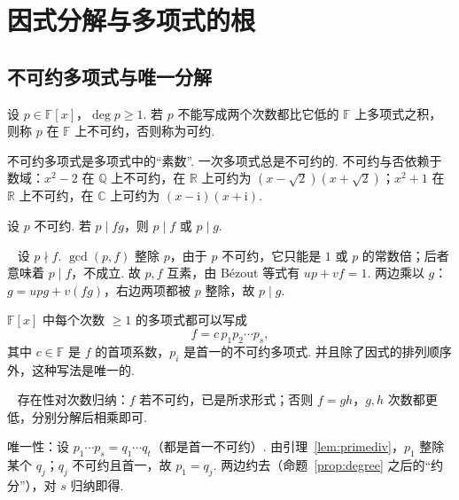 \documentclass[lang=cn,10.5pt,scheme=chinese,toc=twocol,section,chinesefont=nofont,
twoside,citestyle=gb7714-2015,bibstyle=gb7714-2015]{elegantbook}
\DeclareRobustCommand{\textbf}[1]{{\lnsemiboldlatin\lnsemiboldcjk #1}}
\numberwithin{equation}{section}   %
\newcommand{\hB}{\texorpdfstring{\textdagger}{†}}
\newcommand{\hC}{\texorpdfstring{\textdaggerdbl}{‡}}
\newcommand*{\lnlabel}[1]{{\sffamily\bfseries\color{black}#1}}
\renewenvironment{proof}{%
	\par\noindent\lnlabel{\proofname}\;\ \color{black!90}\cfs}{\par}
\begin{document}
\section{\hB 因式分解与多项式的根}

\subsection{\hC 不可约多项式与唯一分解}

\begin{definition}
  设 $p\in\mathbb{F}[x]$，$\deg p\ge1$. 若 $p$ 不能写成两个次数都比它低的 $\mathbb{F}$ 上多项式之积，则称 $p$ 在 $\mathbb{F}$ 上\textbf{不可约}，否则称为\textbf{可约}.
\end{definition}

不可约多项式是多项式中的“素数”. 一次多项式总是不可约的. 不可约与否依赖于数域：$x^2-2$ 在 $\mathbb{Q}$ 上不可约，在 $\mathbb{R}$ 上可约为 $(x-\sqrt2)(x+\sqrt2)$；$x^2+1$ 在 $\mathbb{R}$ 上不可约，在 $\mathbb{C}$ 上可约为 $(x-\mathrm i)(x+\mathrm i)$.

\begin{lemma}
  \label{lem:primediv}
  设 $p$ 不可约. 若 $p\mid fg$，则 $p\mid f$ 或 $p\mid g$.
\end{lemma}
\begin{proof}
  设 $p\nmid f$. $\gcd(p,f)$ 整除 $p$，由于 $p$ 不可约，它只能是 $1$ 或 $p$ 的常数倍；后者意味着 $p\mid f$，不成立. 故 $p,f$ 互素，由 Bézout 等式有 $up+vf=1$. 两边乘以 $g$：$g=upg+v(fg)$，右边两项都被 $p$ 整除，故 $p\mid g$.
\end{proof}

\begin{theorem}[唯一分解定理]\label{thm:uniquefact}
  $\mathbb{F}[x]$ 中每个次数 $\ge1$ 的多项式都可以写成
  \[f=c\,p_1p_2\cdots p_s,\]
  其中 $c\in\mathbb{F}$ 是 $f$ 的首项系数，$p_i$ 是首一的不可约多项式. 并且除了因式的排列顺序外，这种写法是唯一的.
\end{theorem}
\begin{proof}
  \textbf{存在性}对次数归纳：$f$ 若不可约，已是所求形式；否则 $f=gh$，$g,h$ 次数都更低，分别分解后相乘即可.

  \textbf{唯一性}：设 $p_1\cdots p_s=q_1\cdots q_t$（都是首一不可约）. 由引理~\ref{lem:primediv}，$p_1$ 整除某个 $q_j$；$q_j$ 不可约且首一，故 $p_1=q_j$. 两边约去（命题~\ref{prop:degree} 之后的“约分”），对 $s$ 归纳即得.
\end{proof}
\end{document}
